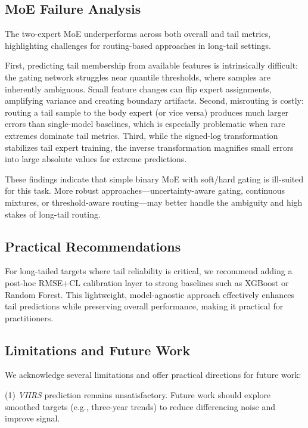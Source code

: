 \documentclass[11pt,conference,onecolumn]{IEEEtran}
\begin{document}
\subsection{MoE Failure Analysis}

The two-expert MoE underperforms across both overall and tail metrics, highlighting challenges for routing-based approaches in long-tail settings.

First, predicting tail membership from available features is intrinsically difficult: the gating network struggles near quantile thresholds, where samples are inherently ambiguous. Small feature changes can flip expert assignments, amplifying variance and creating boundary artifacts. Second, misrouting is costly: routing a tail sample to the body expert (or vice versa) produces much larger errors than single-model baselines, which is especially problematic when rare extremes dominate tail metrics. Third, while the signed-log transformation stabilizes tail expert training, the inverse transformation magnifies small errors into large absolute values for extreme predictions.

These findings indicate that simple binary MoE with soft/hard gating is ill-suited for this task. More robust approaches—uncertainty-aware gating, continuous mixtures, or threshold-aware routing—may better handle the ambiguity and high stakes of long-tail routing.

\subsection{Practical Recommendations}

For long-tailed targets where tail reliability is critical, we recommend adding a post-hoc RMSE+CL calibration layer to strong baselines such as XGBoost or Random Forest. This lightweight, model-agnostic approach effectively enhances tail predictions while preserving overall performance, making it practical for practitioners.

\subsection{Limitations and Future Work}

We acknowledge several limitations and offer practical directions for future work:

(1) \textit{VIIRS} prediction remains unsatisfactory. Future work should explore smoothed targets (e.g., three-year trends) to reduce differencing noise and improve signal.
\end{document}
